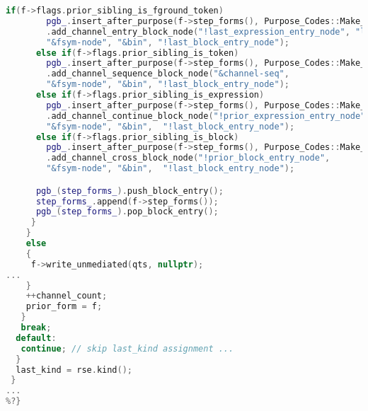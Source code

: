 \begin{lstlisting}[language = C++, numbers = none,
caption={Hypergraph IR Builder},label={lst:figPGB}, 
    basicstyle = \ttfamily\bfseries\scriptsize, linewidth = .9\linewidth]
      if(f->flags.prior_sibling_is_fground_token)
        pgb_.insert_after_purpose(f->step_forms(), Purpose_Codes::Make_Token_Node_FSym)
        .add_channel_entry_block_node("!last_expression_entry_node", "lambda",
        "&fsym-node", "&bin", "!last_block_entry_node");
      else if(f->flags.prior_sibling_is_token)
        pgb_.insert_after_purpose(f->step_forms(), Purpose_Codes::Make_Token_Node_FSym)
        .add_channel_sequence_block_node("&channel-seq",
        "&fsym-node", "&bin", "!last_block_entry_node");
      else if(f->flags.prior_sibling_is_expression)
        pgb_.insert_after_purpose(f->step_forms(), Purpose_Codes::Make_Token_Node_FSym)
        .add_channel_continue_block_node("!prior_expression_entry_node",
        "&fsym-node", "&bin",  "!last_block_entry_node");
      else if(f->flags.prior_sibling_is_block)
        pgb_.insert_after_purpose(f->step_forms(), Purpose_Codes::Make_Token_Node_FSym)
        .add_channel_cross_block_node("!prior_block_entry_node",
        "&fsym-node", "&bin",  "!last_block_entry_node");

      pgb_(step_forms_).push_block_entry();
      step_forms_.append(f->step_forms());
      pgb_(step_forms_).pop_block_entry();
     }
    }
    else
    {
     f->write_unmediated(qts, nullptr);
...
    }
    ++channel_count;
    prior_form = f;
   }
   break;
  default:
   continue; // skip last_kind assignment ...
  }
  last_kind = rse.kind();
 }
...
%?}


\end{lstlisting}
